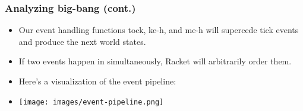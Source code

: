 \documentclass{beamer}
\begin{document}
\begin{frame}
  \frametitle{Analyzing big-bang (cont.)}
  \begin{itemize}
  \item<1-> Our event handling functions tock, ke-h, and me-h will supercede tick events and produce the next world states.
  \item<2-> If two events happen in simultaneously, Racket will arbitrarily order them.
  \item<3-> Here's a visualization of the event pipeline:
  \item<4-> \texttt{[image: images/event-pipeline.png]}
  \end{itemize}
\end{frame}
\end{document}
